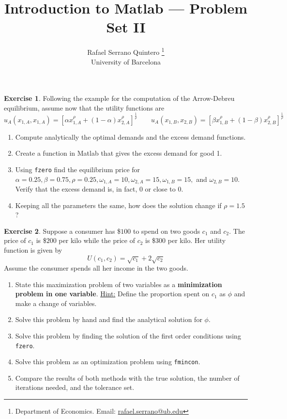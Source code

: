\documentclass[a4paper,11pt]{article}
\title{\textbf{Introduction to Matlab --- Problem Set II}}
\author{Rafael Serrano Quintero
\thanks{Department of Economics. Email: \href{mailto:rafael.serrano@ub.edu}{rafael.serrano@ub.edu}} \\
University of Barcelona \\}
\date{}
\theoremstyle{definition}
\newtheorem{exercise}{Exercise}
\begin{document}
\VerbatimFootnotes

\maketitle

\begin{exercise}
  Following the example for the computation of the Arrow-Debreu equilibrium, assume now that the utility functions are 
  \[
    u_A(x_{1,A}, x_{1,A}) = \left[ \alpha x_{1,A}^{\rho} + (1 - \alpha) x_{2,A}^{\rho} \right]^{\frac{1}{\rho} } \qquad 
    u_A(x_{1,B}, x_{2,B}) = \left[ \beta x_{1,B}^{\rho} + (1 - \beta) x_{2,B}^{\rho} \right]^{\frac{1}{\rho} }
  \]
  \begin{enumerate}
    \item Compute analytically the optimal demands and the excess demand functions. 
    \item Create a function in Matlab that gives the excess demand for good 1. 
    \item Using \verb;fzero; find the equilibrium price for $\alpha = 0.25, \beta = 0.75, \rho = 0.25, \omega_{1,A} = 10, \omega_{2,A} = 15, \omega_{1,B} = 15,$ and $\omega_{2,B} = 10$. Verify that the excess demand is, in fact, $0$ or close to $0$.
    \item Keeping all the parameters the same, how does the solution change if $\rho = 1.5$?
  \end{enumerate}
\end{exercise}

\begin{exercise}
Suppose a consumer has \$$100$ to spend on two goods $c_1$ and $c_2$. The price of $c_1$ is \$$200$ per kilo while the price of $c_2$ is \$$300$ per kilo. Her utility function is given by
\[
U(c_1, c_2) = \sqrt{c_1} + 2\sqrt{c_2}
\]
Assume the consumer spends all her income in the two goods.
\begin{enumerate}
    \item State this maximization problem of two variables as a \textbf{minimization problem in one variable}. \underline{Hint:} Define the proportion spent on $c_1$ as $\phi$ and make a change of variables.
    \item Solve this problem by hand and find the analytical solution for $\phi$.
    \item Solve this problem by finding the solution of the first order conditions using \verb;fzero;.
    \item Solve this problem as an optimization problem using \verb;fmincon;.
    \item Compare the results of both methods with the true solution, the number of iterations needed, and the tolerance set.
\end{enumerate}
\end{exercise}
\end{document}
